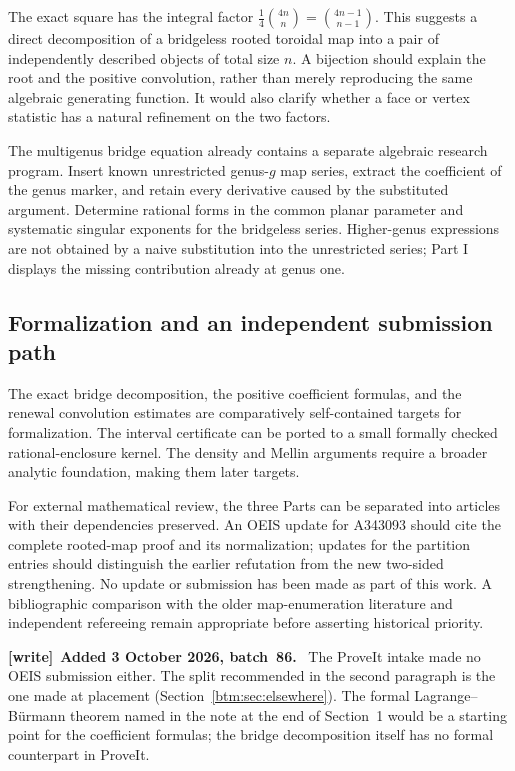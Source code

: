 \documentclass[11pt,letterpaper]{article}
\numberwithin{equation}{section}
\theoremstyle{definition}
\theoremstyle{remark}
\newenvironment{writenote}[1][]{\par\smallskip\begingroup\small
 \noindent\textbf{[write]}\if\relax\detokenize{#1}\relax\else~\textbf{#1.}\fi\ }%
 {\par\endgroup\smallskip}
\begin{document}
The exact square has the integral factor
$\frac14\binom{4n}{n}=\binom{4n-1}{n-1}$.
This suggests a direct decomposition of a bridgeless rooted toroidal
map into a pair of independently described objects of total size $n$.
A bijection should explain the root and the positive convolution,
rather than merely reproducing the same algebraic generating function.
It would also clarify whether a face or vertex statistic has a natural
refinement on the two factors.

The multigenus bridge equation already contains a separate algebraic
research program. Insert known unrestricted genus-$g$ map series,
extract the coefficient of the genus marker, and retain every
derivative caused by the substituted argument. Determine rational
forms in the common planar parameter and systematic singular
exponents for the bridgeless series. Higher-genus expressions are
not obtained by a naive substitution into the unrestricted series;
Part I displays the missing contribution already at genus one.

\subsection{Formalization and an independent submission path}
\label{btm:future:submission}

The exact bridge decomposition, the positive coefficient formulas,
and the renewal convolution estimates are comparatively self-contained
targets for formalization. The interval certificate can be ported
to a small formally checked rational-enclosure kernel. The density
and Mellin arguments require a broader analytic foundation, making
them later targets.

For external mathematical review, the three Parts can be separated
into articles with their dependencies preserved. An OEIS update for
A343093 should cite the complete rooted-map proof and its normalization;
updates for the partition entries should distinguish the earlier
refutation from the new two-sided strengthening. No update or
submission has been made as part of this work. A bibliographic
comparison with the older map-enumeration literature and independent
refereeing remain appropriate before asserting historical priority.

\begin{writenote}[Added 3 October 2026, batch~86]
The ProveIt intake made no OEIS submission either. The split recommended in
the second paragraph is the one made at placement
(Section~\ref{btm:sec:elsewhere}). The formal Lagrange--B\"urmann theorem
named in the note at the end of Section~1 would be a starting point for the
coefficient formulas; the bridge decomposition itself has no formal
counterpart in ProveIt.
\end{writenote}
\end{document}
